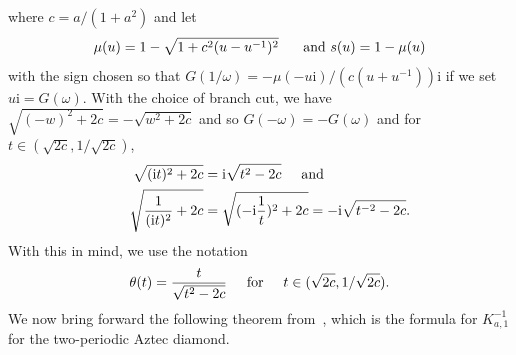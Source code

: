 \documentclass[11pt,twoside]{amsart}
\theoremstyle{plain}
\numberwithin{quest}{section}
\theoremstyle{remark}
\numberwithin{rem}{section}
\theoremstyle{definition}
\begin{document}
	where $c=a/(1+a^2)$
	and let 
	\begin{equation}\label{eq:prev:mu_and_s}
		\mu(u)=1-\sqrt{1+c^2(u-u^{-1})^2} \hspace{5mm}\mbox{ and }s(u)=1-\mu(u)
	\end{equation}
	with the sign chosen so that $G(1/\omega)=-\mu(-u\mathrm{i})/(c(u+u^{-1}))\mathrm{i}$ if we set $u \mathrm{i}=G(\omega)$.  With the choice of branch cut, we have $\sqrt{(-w)^2+2c}=-\sqrt{w^2+2c}$ and so $G(-\omega)=-G(\omega)$ and for $t \in(\sqrt{2c},1/\sqrt{2c})$,
	\begin{equation*}\label{eq:def:branchcutati}
    \begin{split}
        \sqrt{(\mathrm{i} t)^2+2c}&=\mathrm{i}\sqrt{t^2-2c} \hspace{5mm}  \mbox{and} \\
        \hspace{5mm} \sqrt{\frac{1}{(\mathrm{i}t)^2}+2c}&=\sqrt{(-\mathrm{i}\frac{1}{t})^2+2c}=-\mathrm{i}\sqrt{t^{-2}-2c}.
    \end{split}
	\end{equation*}
	With this in mind, we use the notation
	\begin{equation}\label{eq:prev:theta}
		\theta(t)=\frac{t}{\sqrt{t^2-2c}}\hspace{5mm} \mbox{for} \hspace{5mm} t \in (\sqrt{2c},1/\sqrt{2c}).
	\end{equation}
	We now bring forward the following theorem from~\cite{CJ16}, which is the formula for $K^{-1}_{a,1}$ for the two-periodic Aztec diamond. 
\end{document}
